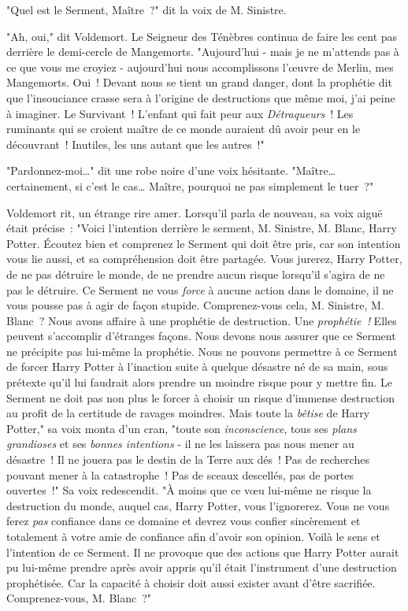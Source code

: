 "Quel est le Serment, Maître~?" dit la voix de M. Sinistre.

"Ah, oui," dit Voldemort. Le Seigneur des Ténèbres continua de faire les cent pas derrière le demi-cercle de Mangemorts. "Aujourd'hui - mais je ne m'attends pas à ce que vous me croyiez - aujourd'hui nous accomplissons l'œuvre de Merlin, mes Mangemorts. Oui~! Devant nous se tient un grand danger, dont la prophétie dit que l'insouciance crasse sera à l'origine de destructions que même moi, j'ai peine à imaginer. Le Survivant~! L'enfant qui fait peur aux \emph{Détraqueurs}~! Les ruminants qui se croient maître de ce monde auraient dû avoir peur en le découvrant~! Inutiles, les uns autant que les autres~!"

"Pardonnez-moi…" dit une robe noire d'une voix hésitante. "Maître… certainement, si c'est le cas… Maître, pourquoi ne pas simplement le tuer~?"

Voldemort rit, un étrange rire amer. Lorsqu'il parla de nouveau, sa voix aiguë était précise~: "Voici l'intention derrière le serment, M. Sinistre, M. Blanc, Harry Potter. Écoutez bien et comprenez le Serment qui doit être pris, car son intention vous lie aussi, et sa compréhension doit être partagée. Vous jurerez, Harry Potter, de ne pas détruire le monde, de ne prendre aucun risque lorsqu'il s'agira de ne pas le détruire. Ce Serment ne vous \emph{force} à aucune action dans le domaine, il ne vous pousse pas à agir de façon stupide. Comprenez-vous cela, M. Sinistre, M. Blanc~? Nous avons affaire à une prophétie de destruction. Une \emph{prophétie~!} Elles peuvent s'accomplir d'étranges façons. Nous devons nous assurer que ce Serment ne précipite pas lui-même la prophétie. Nous ne pouvons permettre à ce Serment de forcer Harry Potter à l'inaction suite à quelque désastre né de sa main, sous prétexte qu'il lui faudrait alors prendre un moindre risque pour y mettre fin. Le Serment ne doit pas non plus le forcer à choisir un risque d'immense destruction au profit de la certitude de ravages moindres. Mais toute la \emph{bêtise} de Harry Potter," sa voix monta d'un cran, "toute son \emph{inconscience}, tous ses \emph{plans grandioses} et ses \emph{bonnes intentions} - il ne les laissera pas nous mener au désastre~! Il ne jouera pas le destin de la Terre aux dés~! Pas de recherches pouvant mener à la catastrophe~! Pas de sceaux descellés, pas de portes ouvertes~!" Sa voix redescendit. "À moins que ce vœu lui-même ne risque la destruction du monde, auquel cas, Harry Potter, vous l'ignorerez. Vous ne vous ferez \emph{pas} confiance dans ce domaine et devrez vous confier sincèrement et totalement à votre amie de confiance afin d'avoir son opinion. Voilà le sens et l'intention de ce Serment. Il ne provoque que des actions que Harry Potter aurait pu lui-même prendre après avoir appris qu'il était l'instrument d'une destruction prophétisée. Car la capacité à choisir doit aussi exister avant d'être sacrifiée. Comprenez-vous, M. Blanc~?"


